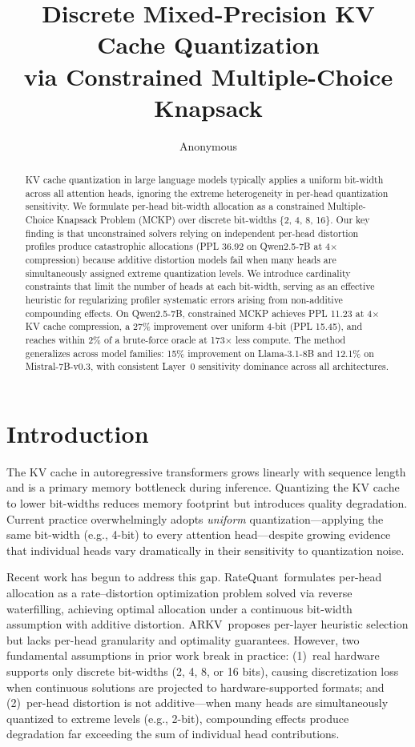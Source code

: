 \documentclass[11pt,a4paper]{article}
\title{Discrete Mixed-Precision KV Cache Quantization\\via Constrained Multiple-Choice Knapsack}
\author{Anonymous}
\begin{document}
\maketitle

\begin{abstract}
KV cache quantization in large language models typically applies a uniform bit-width across all attention heads, ignoring the extreme heterogeneity in per-head quantization sensitivity.
We formulate per-head bit-width allocation as a constrained Multiple-Choice Knapsack Problem (MCKP) over discrete bit-widths \{2, 4, 8, 16\}.
Our key finding is that unconstrained solvers relying on independent per-head distortion profiles produce catastrophic allocations (PPL 36.92 on Qwen2.5-7B at 4$\times$ compression) because additive distortion models fail when many heads are simultaneously assigned extreme quantization levels.
We introduce cardinality constraints that limit the number of heads at each bit-width, serving as an effective heuristic for regularizing profiler systematic errors arising from non-additive compounding effects.
On Qwen2.5-7B, constrained MCKP achieves PPL 11.23 at 4$\times$ KV cache compression, a 27\% improvement over uniform 4-bit (PPL 15.45), and reaches within 2\% of a brute-force oracle at 173$\times$ less compute.
The method generalizes across model families: 15\% improvement on Llama-3.1-8B and 12.1\% on Mistral-7B-v0.3, with consistent Layer~0 sensitivity dominance across all architectures.
\end{abstract}

\section{Introduction}
\label{sec:intro}

The KV cache in autoregressive transformers grows linearly with sequence length and is a primary memory bottleneck during inference.
Quantizing the KV cache to lower bit-widths reduces memory footprint but introduces quality degradation.
Current practice overwhelmingly adopts \emph{uniform} quantization---applying the same bit-width (e.g., 4-bit) to every attention head---despite growing evidence that individual heads vary dramatically in their sensitivity to quantization noise.

Recent work has begun to address this gap.
RateQuant~formulates per-head allocation as a rate--distortion optimization problem solved via reverse waterfilling, achieving optimal allocation under a continuous bit-width assumption with additive distortion.
ARKV~proposes per-layer heuristic selection but lacks per-head granularity and optimality guarantees.
However, two fundamental assumptions in prior work break in practice:
(1)~real hardware supports only discrete bit-widths (2, 4, 8, or 16 bits), causing discretization loss when continuous solutions are projected to hardware-supported formats; and
(2)~per-head distortion is not additive---when many heads are simultaneously quantized to extreme levels (e.g., 2-bit), compounding effects produce degradation far exceeding the sum of individual head contributions.
\end{document}
